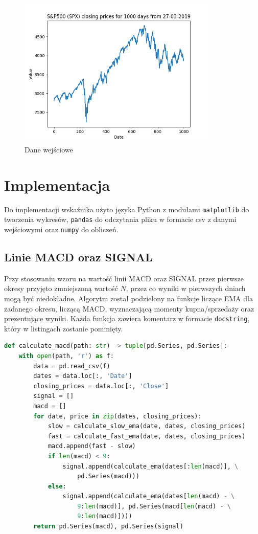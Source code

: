 \documentclass{article}
\begin{document}
\begin{figure}[!b]
\centering
\includegraphics[width=0.85\textwidth]{input_data.png}
\caption{\label{fig:input_data}Dane wejściowe}
\end{figure}

\section{Implementacja}

Do implementacji wskaźnika użyto języka Python z modułami \texttt{matplotlib} do tworzenia wykresów, \texttt{pandas} do odczytania pliku w formacie csv z danymi wejściowymi oraz \texttt{numpy} do obliczeń.

\subsection{Linie MACD oraz SIGNAL}

Przy stosowaniu wzoru na wartość linii MACD oraz SIGNAL przez pierwsze okresy przyjęto zmniejszoną wartość $N$, przez co wyniki w pierwszych dniach mogą być niedokładne. Algorytm został podzielony na funkcje liczące EMA dla zadanego okresu, liczącą MACD, wyznaczającą momenty kupna/sprzedaży oraz prezentujące wyniki. Każda funkcja zawiera komentarz w formacie \texttt{docstring}, który w listingach zostanie pominięty.

\begin{lstlisting}[language=Python, caption=Funkcja obliczająca MACD, captionpos=b]
def calculate_macd(path: str) -> tuple[pd.Series, pd.Series]:
    with open(path, 'r') as f:
        data = pd.read_csv(f)
        dates = data.loc[:, 'Date']
        closing_prices = data.loc[:, 'Close']
        signal = []
        macd = []
        for date, price in zip(dates, closing_prices):
            slow = calculate_slow_ema(date, dates, closing_prices)
            fast = calculate_fast_ema(date, dates, closing_prices)
            macd.append(fast - slow)
            if len(macd) < 9:
                signal.append(calculate_ema(dates[:len(macd)], \
                    pd.Series(macd)))
            else:
                signal.append(calculate_ema(dates[len(macd) - \
                    9:len(macd)], pd.Series(macd[len(macd) - \
                    9:len(macd)])))
        return pd.Series(macd), pd.Series(signal)
\end{lstlisting}
\end{document}
